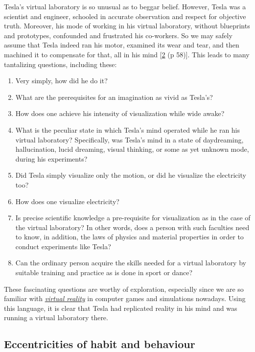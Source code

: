 \documentclass[
  a4paper,
]{article}
\providecommand{\tightlist}{%
  \setlength{\itemsep}{0pt}\setlength{\parskip}{0pt}}
\begin{document}
Tesla's virtual laboratory is so unusual as to beggar belief. However,
Tesla was a scientist and engineer, schooled in accurate observation and
respect for objective truth. Moreover, his mode of working in his
virtual laboratory, without blueprints and prototypes, confounded and
frustrated his co-workers. So we may safely assume that Tesla indeed ran
his motor, examined its wear and tear, and then machined it to
compensate for that, all in his mind
{[}\protect\hyperlink{ref-oneill80}{2} (p 58){]}. This leads to many
tantalizing questions, including these:

\begin{enumerate}
\tightlist
\item
  Very simply, how did he do it?
\item
  What are the prerequisites for an imagination as vivid as Tesla's?
\item
  How does one achieve his intensity of visualization while wide awake?
\item
  What is the peculiar state in which Tesla's mind operated while he ran
  his virtual laboratory? Specifically, was Tesla's mind in a state of
  daydreaming, hallucination, lucid dreaming, visual thinking, or some
  as yet unknown mode, during his experiments?
\item
  Did Tesla simply visualize only the motion, or did he visualize the
  electricity too?
\item
  How does one visualize electricity?
\item
  Is precise scientific knowledge a pre-requisite for visualization as
  in the case of the virtual laboratory? In other words, does a person
  with such faculties need to know, in addition, the laws of physics and
  material properties in order to conduct experiments like Tesla?
\item
  Can the ordinary person acquire the skills needed for a virtual
  laboratory by suitable training and practice as is done in sport or
  dance?
\end{enumerate}

These fascinating questions are worthy of exploration, especially since
we are so familiar with
\href{https://en.wikipedia.org/wiki/Virtual_reality}{\emph{virtual
reality}} in computer games and simulations nowadays. Using this
language, it is clear that Tesla had replicated reality in his mind and
was running a virtual laboratory there.

\hypertarget{eccentricities-of-habit-and-behaviour}{%
\subsection{Eccentricities of habit and
behaviour}\label{eccentricities-of-habit-and-behaviour}}
\end{document}
